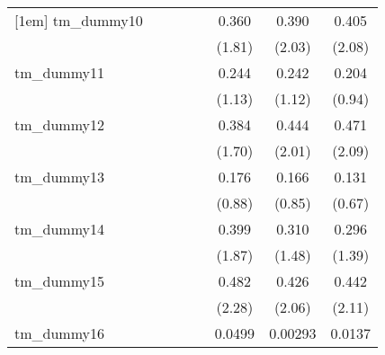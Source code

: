 {\begin{tabular}{l*{7}{c}}
[1em]
tm\_dummy10  &                     &                     &                     &                     &       0.360         &       0.390\sym{*}  &       0.405\sym{*}  \\
            &                     &                     &                     &                     &      (1.81)         &      (2.03)         &      (2.08)         \\
[1em]
tm\_dummy11  &                     &                     &                     &                     &       0.244         &       0.242         &       0.204         \\
            &                     &                     &                     &                     &      (1.13)         &      (1.12)         &      (0.94)         \\
[1em]
tm\_dummy12  &                     &                     &                     &                     &       0.384         &       0.444\sym{*}  &       0.471\sym{*}  \\
            &                     &                     &                     &                     &      (1.70)         &      (2.01)         &      (2.09)         \\
[1em]
tm\_dummy13  &                     &                     &                     &                     &       0.176         &       0.166         &       0.131         \\
            &                     &                     &                     &                     &      (0.88)         &      (0.85)         &      (0.67)         \\
[1em]
tm\_dummy14  &                     &                     &                     &                     &       0.399         &       0.310         &       0.296         \\
            &                     &                     &                     &                     &      (1.87)         &      (1.48)         &      (1.39)         \\
[1em]
tm\_dummy15  &                     &                     &                     &                     &       0.482\sym{*}  &       0.426\sym{*}  &       0.442\sym{*}  \\
            &                     &                     &                     &                     &      (2.28)         &      (2.06)         &      (2.11)         \\
[1em]
tm\_dummy16  &                     &                     &                     &                     &      0.0499         &     0.00293         &      0.0137         \\

\end{tabular}}
